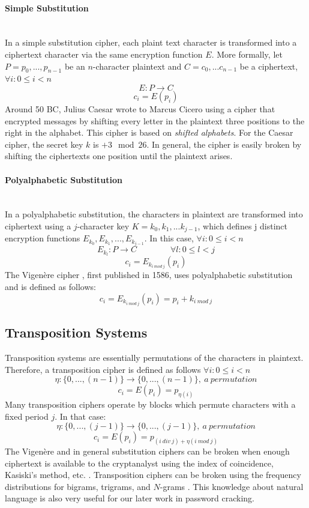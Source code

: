 \paragraph{Simple Substitution} \mbox{} \\ 
In a simple substitution cipher, each plaint text character is transformed into a ciphertext character via the same encryption function $E$. More formally, let $P = p_{0}, ... ,p_{n-1}$ be an $n$-character plaintext and $C=c_{0},...c_{n-1}$ be a ciphertext,  $\forall i : 0 \leq i < n $ 
$$ E : P \rightarrow C$$
$$c_{i} = E (p_{i})$$
Around 50 BC, Julius Caesar wrote to Marcus Cicero using a cipher that encrypted messages by shifting every letter in the plaintext three positions to the right in the alphabet. This cipher is based on \textit{shifted alphabets}. For the Caesar cipher, the secret key $k$ is $+3\mod{26}$. In general, the cipher is easily broken by shifting the ciphertexts one position until the plaintext arises.
\paragraph{Polyalphabetic Substitution} \mbox{} \\ 
In a polyalphabetic substitution, the characters in plaintext are transformed into ciphertext using a $j$-character key $K = k_{0}, k_{1}, ... k_{j-1}$, which defines j distinct encryption functions $E_{k_{0}}, E_{k_{1}}, ... , E_{k_{j-1}}$. In this case, $\forall i : 0 \leq i < n$  $$ E_{k_{l}} : P \rightarrow C   \qquad  \qquad   \forall l : 0 \leq l < j$$
$$ c_{i} = E_{k_{i\ mod\ j}}(p_{i})$$
The Vigen\`{e}re cipher \cite{robling1982cryptography}, first published in 1586, uses polyalphabetic substitution and is defined as follows:$$ c_{i} = E_{k_{i\ mod \ j}}(p_{i}) = p_{i} + k_{i\ mod \ j} $$
\subsection{Transposition Systems}
Transposition systems are essentially permutations of the characters in plaintext. Therefore, a transposition cipher is defined as follows $\forall i : 0 \leq i < n$ 
$$ \eta : \{0,...,(n-1)\} \rightarrow \{0,...,(n-1)\},\ a\ permutation$$
$$c_{i} = E(p_{i}) = p_{\eta (i)}$$
Many transposition ciphers operate by blocks which permute characters with a fixed period $j$. In that case:
$$ \eta : \{0,...,(j-1)\} \rightarrow \{0,...,(j-1)\},\ a\ permutation$$
$$c_{i} = E(p_{i}) = p_{(i\ div\ j)+\eta (i\ mod\ j)}$$
The Vigen\`{e}re and in general substitution ciphers can be broken when enough ciphertext is available to the cryptanalyst using the index of coincidence, Kasiski's method, etc. \cite{davies1989security,robling1982cryptography,kahn1996codebreakers}. Transposition ciphers can be broken using the frequency distributions for bigrams, trigrams, and $N$-grams \cite{davies1989security, robling1982cryptography, kahn1996codebreakers}. This knowledge about natural language is also very useful for our later work in password cracking.
